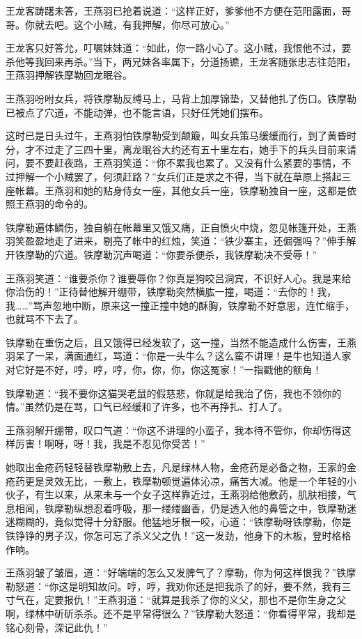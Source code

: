 \documentclass[12pt,oneside]{book}
\begin{document}
王龙客踌躇未答，王燕羽已抢着说道：``这样正好，爹爹他不方便在范阳露面，哥哥。你就去吧。这个小贼，有我押解，你尽可放心。''

王龙客只好答允，叮嘱妹妹道：``如此，你一路小心了。这小贼，我恨他不过，要杀他等我回来再杀。''当下，两兄妹各率属下，分道扬镳，王龙客随张忠志往范阳，王燕羽押解铁摩勒回龙眠谷。

王燕羽吩咐女兵，将铁摩勒反缚马上，马背上加厚锦垫，又替他扎了伤口。铁摩勒已被点了穴道，不能动弹，也不能言语，只好任凭她们摆布。

这时已是日头过午，王燕羽怕铁摩勒受到颠簸，叫女兵策马缓缓而行，到了黄昏时分，才不过走了三四十里，离龙眠谷大约还有五十里左右，她手下的兵头目前来请问，要不要赶夜路，王燕羽笑道：``你不累我也累了。又没有什么紧要的事情，不过押解一个小贼罢了，何须赶路？''女兵们正是求之不得，当下就在草原上搭起三座帐幕。王燕羽和她的贴身侍女一座，其他女兵一座，铁摩勒独自一座，这都是依照王燕羽的命令的。

铁摩勒遍体鳞伤，独自躺在帐幕里又饿又痛，正自愤火中烧，忽见帐篷开处，王燕羽笑盈盈地走了进来，剔亮了帐中的红烛，笑道：``铁少寨主，还倔强吗？''伸手解开铁摩勒的穴道。铁摩勒沉声喝道：``你要杀便杀，我铁摩勒决不受辱！''

王燕羽笑道：``谁要杀你？谁要辱你？你真是狗咬吕洞宾，不识好人心。我是来给你治伤的！''正待替他解开绷带，铁摩勒突然横肱一撞，喝道：``去你的！我，我\ldots\ldots{}''骂声忽地中断，原来这一撞正撞中她的酥胸，铁摩勒不好意思，连忙缩手，也就骂不下去了。

铁摩勒在重伤之后，且又饿得已经发软了，这一撞，当然不能造成什么伤害，王燕羽呆了一呆，满面通红，骂道：``你是一头牛么？这么蛮不讲理！是牛也知道人家对它好是不好，哼，哼，哼，你，你，你，你这冤家！''一指戳他的额角！

铁摩勒道：``我不要你这猫哭老鼠的假慈悲，你就是给我治了伤，我也不领你的情。''虽然仍是在骂，口气已经缓和了许多，也不再挣扎、打人了。

王燕羽解开绷带，叹口气道：``你这不讲理的小蛮子，我本待不管你，你却伤得这样厉害！啊呀，呀！我，我是不忍见你受苦！''

她取出金疮药轻轻替铁摩勒敷上去，凡是绿林人物，金疮药是必备之物，王家的金疮药更是灵效无比，一敷上，铁摩勒顿觉遍体沁凉，痛苦大减。他是一个年轻的小伙子，有生以来，从来未与一个女子这样靠近过，王燕羽给他敷药，肌肤相接，气息相闻，铁摩勒纵想忍着呼吸，那一缕缕幽香，仍是透入他的鼻管之中，铁摩勒迷迷糊糊的，竟似觉得十分舒服。他猛地牙根一咬，心道：``铁摩勒呀铁摩勒，你是铁铮铮的男子汉，你怎可忘了杀义父之仇！''这一发劲，他身下的木板，登时格格作响。

王燕羽皱了皱眉，道：``好端端的怎么又发脾气了？摩勒，你为何这样恨我？''铁摩勒怒道：``你这是明知故问。哼，哼，我劝你还是把我杀了的好，要不然，我有三寸气在，定要报仇！''王燕羽道：``就算是我杀了你的义父，那也不是你生身之父啊，绿林中斫斫杀杀。还不是平常得很么？''铁摩勒大怒道：``你看得平常，我却是铭心刻骨，深记此仇！''
\end{document}
